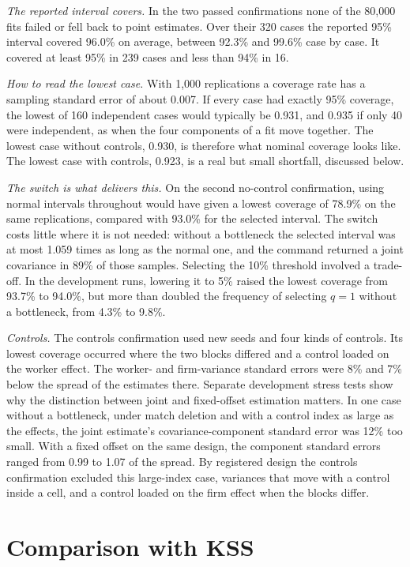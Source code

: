 \emph{The reported interval covers.} In the two passed confirmations none of the
80,000 fits failed or fell back to point estimates. Over their 320 cases the reported
95\% interval covered 96.0\% on average, between 92.3\% and 99.6\% case by case. It
covered at least 95\% in 239 cases and less than 94\% in 16.

\emph{How to read the lowest case.} With 1,000 replications a coverage rate has a
sampling standard error of about 0.007. If every case had exactly 95\% coverage, the
lowest of 160 independent cases would typically be 0.931, and 0.935 if only 40 were
independent, as when the four components of a fit move together. The lowest case
without controls, 0.930, is therefore what nominal coverage looks like. The lowest case
with controls, 0.923, is a real but small shortfall, discussed below.

\emph{The switch is what delivers this.} On the second no-control confirmation, using
normal intervals throughout would have given a lowest coverage of 78.9\% on the same
replications, compared with 93.0\% for the selected interval. The switch costs little
where it is not needed: without a bottleneck the selected interval was at most 1.059
times as long as the normal one, and the command returned a joint covariance in 89\%
of those samples. Selecting the 10\% threshold involved a trade-off. In the development
runs, lowering it to 5\% raised the lowest coverage from 93.7\% to 94.0\%, but more
than doubled the frequency of selecting $q=1$ without a bottleneck, from 4.3\% to
9.8\%.

\emph{Controls.} The controls confirmation used new seeds and four kinds of controls.
Its lowest coverage occurred where the two blocks differed and a control loaded on the
worker effect. The worker- and firm-variance standard errors were 8\% and 7\% below
the spread of the estimates there. Separate development stress tests show why the
distinction between joint and fixed-offset estimation matters. In one case without a
bottleneck, under match deletion and with a control index as large as the effects, the
joint estimate's covariance-component standard error was 12\% too small. With a fixed
offset on the same design, the component standard errors ranged from 0.99 to 1.07 of
the spread. By registered design the controls confirmation excluded this large-index
case, variances that move with a control inside a cell, and a control loaded on the
firm effect when the blocks differ.

\section{Comparison with KSS}\label{sec:kss}\label{kss:sec:empirical}
